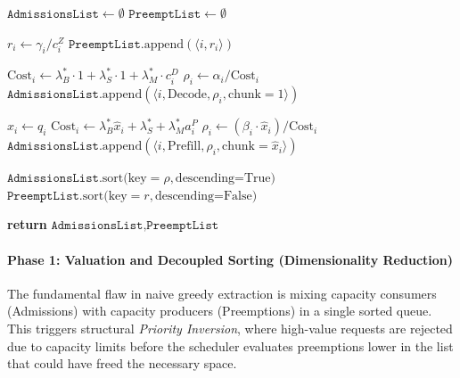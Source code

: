 \documentclass[11pt]{article}
\begin{document}
\begin{algorithm}[t]
\caption{Phase 1: Valuation \& Sorting (Dimensionality Reduction)}
\label{alg:phase1_sorting}
\begin{algorithmic}[1]
    \State $\texttt{AdmissionsList} \gets \emptyset$
    \State $\texttt{PreemptList} \gets \emptyset$
    
        \State {}
            \State $r_i \gets \gamma_i / c_i^Z$ 
            \State $\texttt{PreemptList}.\text{append}(\langle i, r_i \rangle)$
        \EndIf
        
        \State {}
            \State {}
            \State $\text{Cost}_i \gets \lambda_B^* \cdot 1 + \lambda_S^* \cdot 1 + \lambda_M^* \cdot c_i^D$
            \State $\rho_i \gets \alpha_i / \text{Cost}_i$
            \State $\texttt{AdmissionsList}.\text{append}(\langle i, \text{Decode}, \rho_i, \text{chunk}=1 \rangle)$
            
            \State {}
            \State $\hat{x}_i \gets q_i$ 
            \State \(\text{Cost}_i \gets \lambda_B^* \hat{x}_i + \lambda_S^* + \lambda_M^* a_i^P\)
            \State $\rho_i \gets (\beta_i \cdot \hat{x}_i) / \text{Cost}_i$
            \State $\texttt{AdmissionsList}.\text{append}(\langle i, \text{Prefill}, \rho_i, \text{chunk}=\hat{x}_i \rangle)$
        \EndIf
    \EndFor
    
    \State {}
    \State $\texttt{AdmissionsList}.\text{sort(key}=\rho, \text{descending=True)}$ 
    \State $\texttt{PreemptList}.\text{sort(key}=r, \text{descending=False)}$ 
    
    \State \textbf{return} $\texttt{AdmissionsList}, \texttt{PreemptList}$
\EndProcedure
\end{algorithmic}
\end{algorithm}


\paragraph{Phase 1: Valuation and Decoupled Sorting (Dimensionality Reduction)}
The fundamental flaw in naive greedy extraction is mixing capacity consumers (Admissions) with capacity producers (Preemptions) in a single sorted queue. This triggers structural \textit{Priority Inversion}, where high-value requests are rejected due to capacity limits before the scheduler evaluates preemptions lower in the list that could have freed the necessary space. 
\end{document}
